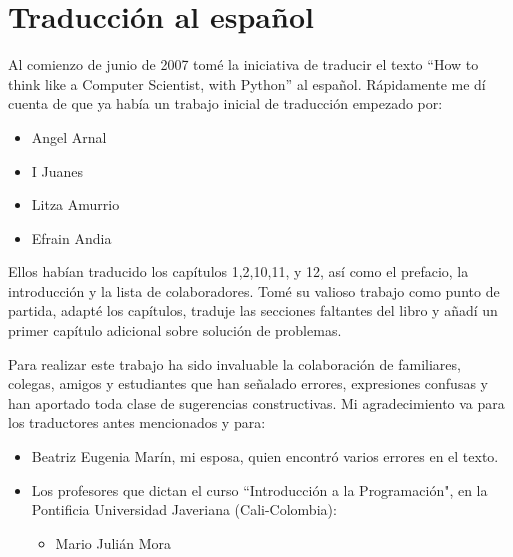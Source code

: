 


\chapter{Traducción al español}


Al comienzo de junio de 2007 tomé la iniciativa de traducir el texto 
``How to think like a Computer Scientist, with Python'' al español. Rápidamente
me dí cuenta de que ya había un trabajo inicial de traducción empezado por:

\begin{itemize}

\item Angel Arnal
\item I Juanes
\item Litza Amurrio
\item Efrain Andia

\end{itemize}

Ellos habían traducido los capítulos 1,2,10,11, y 12, así como el prefacio,
la introducción y la lista de colaboradores. Tomé su valioso trabajo como
punto de partida, adapté los capítulos, traduje las secciones faltantes 
del libro y añadí un primer capítulo adicional sobre solución de problemas.

Para realizar este trabajo ha sido invaluable la colaboración de familiares, 
colegas, amigos y estudiantes que han señalado errores, expresiones confusas y han 
aportado toda clase de sugerencias constructivas. Mi agradecimiento va para los
traductores antes mencionados y para:

\begin{itemize}

\item Beatriz Eugenia Marín, mi esposa, quien encontró varios errores en el texto.

\item Los profesores que dictan el curso ``Introducción a la Programación", en 
la Pontificia Universidad Javeriana (Cali-Colombia): 
  \begin{itemize}
   \item Mario Julián Mora   
\end{itemize}
   
\end{itemize}


